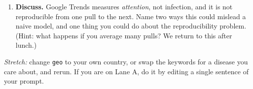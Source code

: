 \documentclass[11pt]{article}
\begin{document}
\begin{enumerate}[label=(\alph*)]
  \item \textbf{Discuss.} Google Trends measures \emph{attention}, not infection, and it
        is not reproducible from one pull to the next. Name two ways this could mislead a
        naive model, and one thing you could do about the reproducibility problem.
        (Hint: what happens if you average many pulls? We return to this after lunch.)
\end{enumerate}

\vfill
\noindent\textit{Stretch:} change \texttt{geo} to your own country, or swap the keywords
for a disease you care about, and rerun. If you are on Lane A, do it by editing a single
sentence of your prompt.
\end{document}
